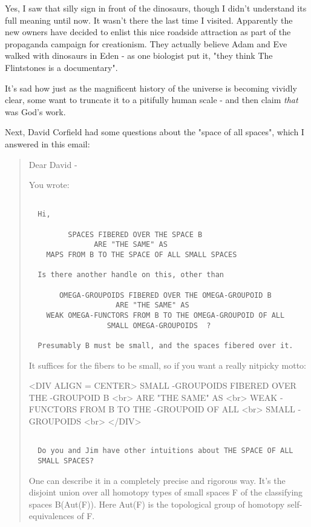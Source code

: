 Yes, I saw that silly sign in front of the dinosaurs, though I didn't 
understand its full meaning until now.  It wasn't there the last time 
I visited.  Apparently the new owners have decided to enlist this nice 
roadside attraction as part of the propaganda campaign for creationism. 
They actually believe Adam and Eve walked with dinosaurs in Eden - as 
one biologist put it, "they think The Flintstones is a documentary".

It's sad how just as the magnificent history of the universe is becoming
vividly clear, some want to truncate it to a pitifully human scale - 
and then claim \emph{that} was God's work.

Next, David Corfield had some questions about the "space of all spaces",
which I answered in this email:

\begin{quote}
 Dear David - 

 You wrote:


\begin{verbatim}

  Hi,
  
         SPACES FIBERED OVER THE SPACE B 
               ARE "THE SAME" AS 
    MAPS FROM B TO THE SPACE OF ALL SMALL SPACES 
  
  Is there another handle on this, other than
  
       OMEGA-GROUPOIDS FIBERED OVER THE OMEGA-GROUPOID B 
                    ARE "THE SAME" AS 
    WEAK OMEGA-FUNCTORS FROM B TO THE OMEGA-GROUPOID OF ALL
                  SMALL OMEGA-GROUPOIDS  ?
  
  Presumably B must be small, and the spaces fibered over it.
\end{verbatim}
    

 It suffices for the fibers to be small, so if you want a really
nitpicky motto:

<DIV ALIGN = CENTER>
    SMALL \omega -GROUPOIDS FIBERED OVER THE \omega -GROUPOID B <br>
                    ARE "THE SAME" AS <br>
    WEAK \omega -FUNCTORS FROM B TO THE \omega -GROUPOID OF ALL <br>
              SMALL \omega -GROUPOIDS <br> 
</DIV>


\begin{verbatim}

  Do you and Jim have other intuitions about THE SPACE OF ALL
  SMALL SPACES? 
\end{verbatim}
    
 One can describe it in a completely precise and rigorous way.
 It's the disjoint union over all homotopy types of small
 spaces F of the classifying spaces B(Aut(F)).  Here Aut(F) is the 
 topological group of homotopy self-equivalences of F.
 

\end{quote}
